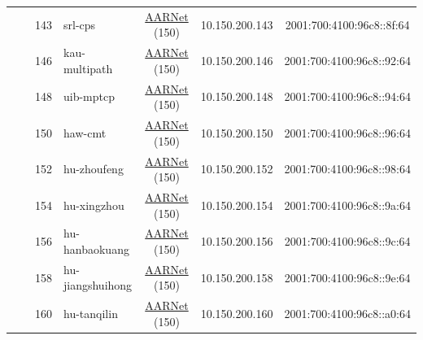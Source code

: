 \begin{small}
\begin{center}
\begin{longtable}{|c|c|c|c|c|c|c|c|}
  &  & \tiny{143} & \multicolumn{1}{|l|}{\tiny{srl-cps}} & \multicolumn{2}{|c|}{\tiny{\href{https://www.aarnet.edu.au/}{AARNet} (150)}} & \tiny{10.150.200.143} & \tiny{2001:700:4100:96c8::8f:64} \\* \cline{3-3}\cline{4-4}\cline{5-5}\cline{6-6}\cline{7-7}\cline{8-8}
  &  & \tiny{146} & \multicolumn{1}{|l|}{\tiny{kau-multipath}} & \multicolumn{2}{|c|}{\tiny{\href{https://www.aarnet.edu.au/}{AARNet} (150)}} & \tiny{10.150.200.146} & \tiny{2001:700:4100:96c8::92:64} \\* \cline{3-3}\cline{4-4}\cline{5-5}\cline{6-6}\cline{7-7}\cline{8-8}
  &  & \tiny{148} & \multicolumn{1}{|l|}{\tiny{uib-mptcp}} & \multicolumn{2}{|c|}{\tiny{\href{https://www.aarnet.edu.au/}{AARNet} (150)}} & \tiny{10.150.200.148} & \tiny{2001:700:4100:96c8::94:64} \\* \cline{3-3}\cline{4-4}\cline{5-5}\cline{6-6}\cline{7-7}\cline{8-8}
  &  & \tiny{150} & \multicolumn{1}{|l|}{\tiny{haw-cmt}} & \multicolumn{2}{|c|}{\tiny{\href{https://www.aarnet.edu.au/}{AARNet} (150)}} & \tiny{10.150.200.150} & \tiny{2001:700:4100:96c8::96:64} \\* \cline{3-3}\cline{4-4}\cline{5-5}\cline{6-6}\cline{7-7}\cline{8-8}
  &  & \tiny{152} & \multicolumn{1}{|l|}{\tiny{hu-zhoufeng}} & \multicolumn{2}{|c|}{\tiny{\href{https://www.aarnet.edu.au/}{AARNet} (150)}} & \tiny{10.150.200.152} & \tiny{2001:700:4100:96c8::98:64} \\* \cline{3-3}\cline{4-4}\cline{5-5}\cline{6-6}\cline{7-7}\cline{8-8}
  &  & \tiny{154} & \multicolumn{1}{|l|}{\tiny{hu-xingzhou}} & \multicolumn{2}{|c|}{\tiny{\href{https://www.aarnet.edu.au/}{AARNet} (150)}} & \tiny{10.150.200.154} & \tiny{2001:700:4100:96c8::9a:64} \\* \cline{3-3}\cline{4-4}\cline{5-5}\cline{6-6}\cline{7-7}\cline{8-8}
  &  & \tiny{156} & \multicolumn{1}{|l|}{\tiny{hu-hanbaokuang}} & \multicolumn{2}{|c|}{\tiny{\href{https://www.aarnet.edu.au/}{AARNet} (150)}} & \tiny{10.150.200.156} & \tiny{2001:700:4100:96c8::9c:64} \\* \cline{3-3}\cline{4-4}\cline{5-5}\cline{6-6}\cline{7-7}\cline{8-8}
  &  & \tiny{158} & \multicolumn{1}{|l|}{\tiny{hu-jiangshuihong}} & \multicolumn{2}{|c|}{\tiny{\href{https://www.aarnet.edu.au/}{AARNet} (150)}} & \tiny{10.150.200.158} & \tiny{2001:700:4100:96c8::9e:64} \\* \cline{3-3}\cline{4-4}\cline{5-5}\cline{6-6}\cline{7-7}\cline{8-8}
  &  & \tiny{160} & \multicolumn{1}{|l|}{\tiny{hu-tanqilin}} & \multicolumn{2}{|c|}{\tiny{\href{https://www.aarnet.edu.au/}{AARNet} (150)}} & \tiny{10.150.200.160} & \tiny{2001:700:4100:96c8::a0:64} \\* \cline{3-3}\cline{4-4}\cline{5-5}\cline{6-6}\cline{7-7}\cline{8-8}

\end{longtable}
\end{center}
\end{small}
